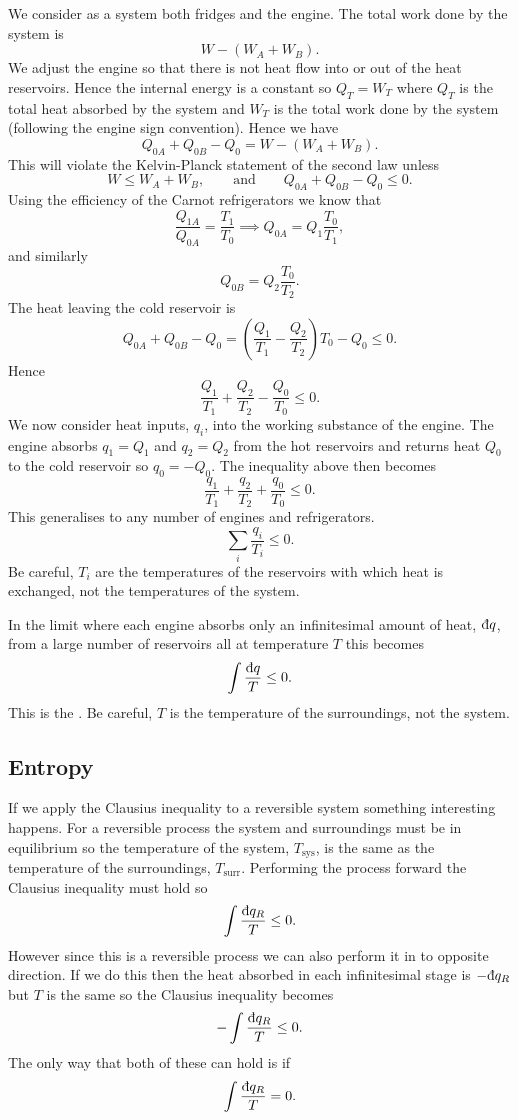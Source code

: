\documentclass[a4paper]{article}
\newcommand{\sys}{{\mathrm{sys}}}
\newcommand{\surr}{{\mathrm{surr}}}
\newcommand{\ddbar}[1]{\text{\dj}{#1}}
\begin{document}
    We consider as a system both fridges and the engine.
    The total work done by the system is
    \[W - (W_A + W_B).\]
    We adjust the engine so that there is not heat flow into or out of the heat reservoirs.
    Hence the internal energy is a constant so \(Q_T = W_T\) where \(Q_T\) is the total heat absorbed by the system and \(W_T\) is the total work done by the system (following the engine sign convention).
    Hence we have
    \[Q_{0A} + Q_{0B} - Q_0 = W - (W_A + W_B).\]
    This will violate the Kelvin-Planck statement of the second law unless
    \[W \le W_A + W_B,\qquad\text{and}\qquad Q_{0A} + Q_{0B} - Q_0 \le 0.\]
    Using the efficiency of the Carnot refrigerators we know that
    \[\frac{Q_{1A}}{Q_{0A}} = \frac{T_1}{T_0} \implies Q_{0A} = Q_1\frac{T_0}{T_1},\]
    and similarly
    \[Q_{0B} = Q_2\frac{T_0}{T_2}.\]
    The heat leaving the cold reservoir is
    \[Q_{0A} + Q_{0B} - Q_0 = \left(\frac{Q_1}{T_1} - \frac{Q_2}{T_2}\right)T_0 - Q_0 \le 0.\]
    Hence
    \[\frac{Q_1}{T_1} + \frac{Q_2}{T_2} - \frac{Q_0}{T_0} \le 0.\]
    We now consider heat inputs, \(q_i\), into the working substance of the engine.
    The engine absorbs \(q_1 = Q_1\) and \(q_2 = Q_2\) from the hot reservoirs and returns heat \(Q_0\) to the cold reservoir so \(q_0 = -Q_0\).
    The inequality above then becomes
    \[\frac{q_1}{T_1} + \frac{q_2}{T_2} + \frac{q_0}{T_0} \le 0.\]
    This generalises to any number of engines and refrigerators.
    \[\sum_i \frac{q_i}{T_i} \le 0.\]
    Be careful, \(T_i\) are the temperatures of the reservoirs with which heat is exchanged, not the temperatures of the system.
    
    In the limit where each engine absorbs only an infinitesimal amount of heat, \(\ddbar{q}\), from a large number of reservoirs all at temperature \(T\) this becomes
    \[\int \frac{\ddbar{q}}{T} \le 0.\]
    This is the .
    Be careful, \(T\) is the temperature of the surroundings, not the system.
    
    \subsection{Entropy}
    If we apply the Clausius inequality to a reversible system something interesting happens.
    For a reversible process the system and surroundings must be in equilibrium so the temperature of the system, \(T_\sys\), is the same as the temperature of the surroundings, \(T_\surr\).
    Performing the process forward the Clausius inequality must hold so
    \[\int\frac{\ddbar{q_R}}{T} \le 0.\]
    However since this is a reversible process we can also perform it in to opposite direction.
    If we do this then the heat absorbed in each infinitesimal stage is \(-\ddbar{q_R}\) but \(T\) is the same so the Clausius inequality becomes
    \[-\int\frac{\ddbar{q_R}}{T} \le 0.\]
    The only way that both of these can hold is if
    \[\int\frac{\ddbar{q_R}}{T} = 0.\]
    
\end{document}
